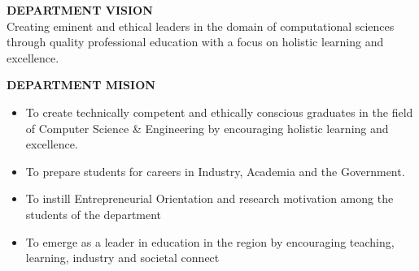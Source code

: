 

\begin{center}


\textbf{\fontsize{15}{30}\selectfont DEPARTMENT VISION}\\
 \vspace{1em}
Creating eminent and ethical leaders in the domain of computational sciences
through quality professional education with a focus on holistic learning and
excellence.

\end{center}

\begin{center}

 \vspace{1em}
\begin{center}
\textbf{\fontsize{15}{30}\selectfont DEPARTMENT MISION}\\
\end{center}
 \vspace{1em}
\begin{itemize}
\item To create technically competent and ethically conscious graduates in the field of
Computer Science \& Engineering by encouraging holistic learning and excellence.\\
\item To prepare students for careers in Industry, Academia and the Government.\\
\item To instill Entrepreneurial Orientation and research motivation among the students of
the department\\
\item To emerge as a leader in education in the region by encouraging teaching, learning,
industry and societal connect
\end{itemize}

\end{center}








